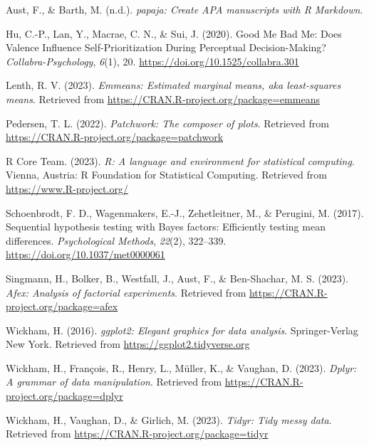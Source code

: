 \documentclass[
  man]{apa6}
\newlength{\cslhangindent}
\newlength{\cslentryspacingunit} %
\newenvironment{CSLReferences}[2] %
 {%
  \setlength{\parindent}{0pt}
  \ifodd #1
  \let\oldpar\par
  \def\par{\hangindent=\cslhangindent\oldpar}
  \fi
  \setlength{\parskip}{#2\cslentryspacingunit}
 }%
 {}
\begin{document}
\hypertarget{refs}{}
\begin{CSLReferences}{1}{0}
\leavevmode{}%
Aust, F., \& Barth, M. (n.d.). \emph{{papaja}: {Create} {APA} manuscripts with {R Markdown}}.

\leavevmode{}%
Hu, C.-P., Lan, Y., Macrae, C. N., \& Sui, J. (2020). Good {Me} {Bad} {Me}: {Does} {Valence} {Influence} {Self}-{Prioritization} {During} {Perceptual} {Decision}-{Making}? \emph{Collabra-Psychology}, \emph{6}(1), 20. \url{https://doi.org/10.1525/collabra.301}

\leavevmode{}%
Lenth, R. V. (2023). \emph{Emmeans: Estimated marginal means, aka least-squares means}. Retrieved from \url{https://CRAN.R-project.org/package=emmeans}

\leavevmode{}%
Pedersen, T. L. (2022). \emph{Patchwork: The composer of plots}. Retrieved from \url{https://CRAN.R-project.org/package=patchwork}

\leavevmode{}%
R Core Team. (2023). \emph{R: A language and environment for statistical computing}. Vienna, Austria: R Foundation for Statistical Computing. Retrieved from \url{https://www.R-project.org/}

\leavevmode{}%
Schoenbrodt, F. D., Wagenmakers, E.-J., Zehetleitner, M., \& Perugini, M. (2017). Sequential hypothesis testing with {Bayes} factors: {Efficiently} testing mean differences. \emph{Psychological Methods}, \emph{22}(2), 322--339. \url{https://doi.org/10.1037/met0000061}

\leavevmode{}%
Singmann, H., Bolker, B., Westfall, J., Aust, F., \& Ben-Shachar, M. S. (2023). \emph{Afex: Analysis of factorial experiments}. Retrieved from \url{https://CRAN.R-project.org/package=afex}

\leavevmode{}%
Wickham, H. (2016). \emph{ggplot2: Elegant graphics for data analysis}. Springer-Verlag New York. Retrieved from \url{https://ggplot2.tidyverse.org}

\leavevmode{}%
Wickham, H., François, R., Henry, L., Müller, K., \& Vaughan, D. (2023). \emph{Dplyr: A grammar of data manipulation}. Retrieved from \url{https://CRAN.R-project.org/package=dplyr}

\leavevmode{}%
Wickham, H., Vaughan, D., \& Girlich, M. (2023). \emph{Tidyr: Tidy messy data}. Retrieved from \url{https://CRAN.R-project.org/package=tidyr}

\end{CSLReferences}
\end{document}
